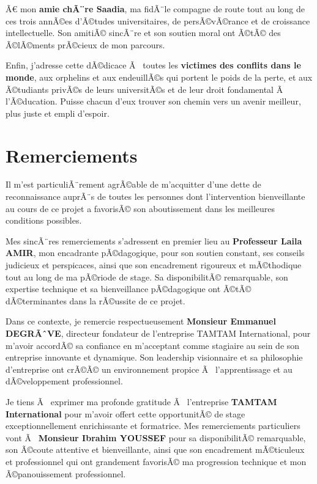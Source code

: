 \documentclass{rapportPFEHIND}
\begin{document}
Ã€ mon \textbf{amie chÃ¨re Saadia}, ma fidÃ¨le compagne de route tout au long de ces trois annÃ©es d'Ã©tudes universitaires, de persÃ©vÃ©rance et de croissance intellectuelle. Son amitiÃ© sincÃ¨re et son soutien moral ont Ã©tÃ© des Ã©lÃ©ments prÃ©cieux de mon parcours.

Enfin, j'adresse cette dÃ©dicace Ã  toutes les \textbf{victimes des conflits dans le monde}, aux orphelins et aux endeuillÃ©s qui portent le poids de la perte, et aux Ã©tudiants privÃ©s de leurs universitÃ©s et de leur droit fondamental Ã  l'Ã©ducation. Puisse chacun d'eux trouver son chemin vers un avenir meilleur, plus juste et empli d'espoir.

\vspace{2cm}
\newpage

\section*{Remerciements}

Il m'est particuliÃ¨rement agrÃ©able de m'acquitter d'une dette de reconnaissance auprÃ¨s de toutes les personnes dont l'intervention bienveillante au cours de ce projet a favorisÃ© son aboutissement dans les meilleures conditions possibles.

Mes sincÃ¨res remerciements s'adressent en premier lieu au \textbf{Professeur Laila AMIR}, mon encadrante pÃ©dagogique, pour son soutien constant, ses conseils judicieux et perspicaces, ainsi que son encadrement rigoureux et mÃ©thodique tout au long de ma pÃ©riode de stage. Sa disponibilitÃ© remarquable, son expertise technique et sa bienveillance pÃ©dagogique ont Ã©tÃ© dÃ©terminantes dans la rÃ©ussite de ce projet.

Dans ce contexte, je remercie respectueusement \textbf{Monsieur Emmanuel DEGRÃˆVE}, directeur fondateur de l'entreprise TAMTAM International, pour m'avoir accordÃ© sa confiance en m'acceptant comme stagiaire au sein de son entreprise innovante et dynamique. Son leadership visionnaire et sa philosophie d'entreprise ont crÃ©Ã© un environnement propice Ã  l'apprentissage et au dÃ©veloppement professionnel.

Je tiens Ã  exprimer ma profonde gratitude Ã  l'entreprise \textbf{TAMTAM International} pour m'avoir offert cette opportunitÃ© de stage exceptionnellement enrichissante et formatrice. Mes remerciements particuliers vont Ã  \textbf{Monsieur Ibrahim YOUSSEF} pour sa disponibilitÃ© remarquable, son Ã©coute attentive et bienveillante, ainsi que son encadrement mÃ©ticuleux et professionnel qui ont grandement favorisÃ© ma progression technique et mon Ã©panouissement professionnel.
\end{document}
